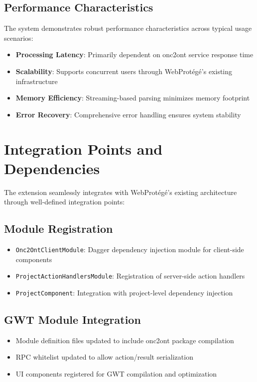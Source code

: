 \subsection{Performance Characteristics}

The system demonstrates robust performance characteristics across typical usage scenarios:

\begin{itemize}
\item \textbf{Processing Latency}: Primarily dependent on onc2ont service response time
\item \textbf{Scalability}: Supports concurrent users through WebProtégé's existing infrastructure
\item \textbf{Memory Efficiency}: Streaming-based parsing minimizes memory footprint
\item \textbf{Error Recovery}: Comprehensive error handling ensures system stability
\end{itemize}

\section{Integration Points and Dependencies}

The extension seamlessly integrates with WebProtégé's existing architecture through well-defined integration points:

\subsection{Module Registration}
\begin{itemize}
\item \texttt{Onc2OntClientModule}: Dagger dependency injection module for client-side components
\item \texttt{ProjectActionHandlersModule}: Registration of server-side action handlers
\item \texttt{ProjectComponent}: Integration with project-level dependency injection
\end{itemize}

\subsection{GWT Module Integration}
\begin{itemize}
\item Module definition files updated to include onc2ont package compilation
\item RPC whitelist updated to allow action/result serialization
\item UI components registered for GWT compilation and optimization
\end{itemize}

